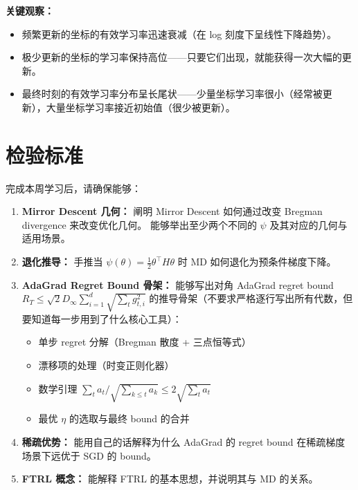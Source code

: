 \documentclass[12pt,a4paper]{ctexart}
\theoremstyle{definition}
\theoremstyle{plain}
\theoremstyle{remark}
\begin{document}
\textbf{关键观察：}
\begin{itemize}
  \item 频繁更新的坐标的有效学习率迅速衰减（在 log 刻度下呈线性下降趋势）。
  \item 极少更新的坐标的学习率保持高位——只要它们出现，就能获得一次大幅的更新。
  \item 最终时刻的有效学习率分布呈长尾状——少量坐标学习率很小（经常被更新），大量坐标学习率接近初始值（很少被更新）。
\end{itemize}

\section{检验标准}

完成本周学习后，请确保能够：

\begin{enumerate}
  \item \textbf{Mirror Descent 几何：}
  阐明 Mirror Descent 如何通过改变 Bregman divergence 来改变优化几何。
  能够举出至少两个不同的 $\psi$ 及其对应的几何与适用场景。

  \item \textbf{退化推导：}
  手推当 $\psi(\theta) = \frac{1}{2}\theta^\top H \theta$ 时 MD 如何退化为预条件梯度下降。

  \item \textbf{AdaGrad Regret Bound 骨架：}
  能够写出对角 AdaGrad regret bound $R_T \le \sqrt{2} D_\infty \sum_{i=1}^d \sqrt{\sum_t g_{t,i}^2}$
  的推导骨架（不要求严格逐行写出所有代数，但要知道每一步用到了什么核心工具）：
  \begin{itemize}
    \item 单步 regret 分解（Bregman 散度 + 三点恒等式）
    \item 漂移项的处理（时变正则化器）
    \item 数学引理 $\sum_t a_t/\sqrt{\sum_{k\le t}a_k} \le 2\sqrt{\sum_t a_t}$
    \item 最优 $\eta$ 的选取与最终 bound 的合并
  \end{itemize}

  \item \textbf{稀疏优势：}
  能用自己的话解释为什么 AdaGrad 的 regret bound 在稀疏梯度场景下远优于 SGD 的 bound。

  \item \textbf{FTRL 概念：}
  能解释 FTRL 的基本思想，并说明其与 MD 的关系。
\end{enumerate}
\end{document}
